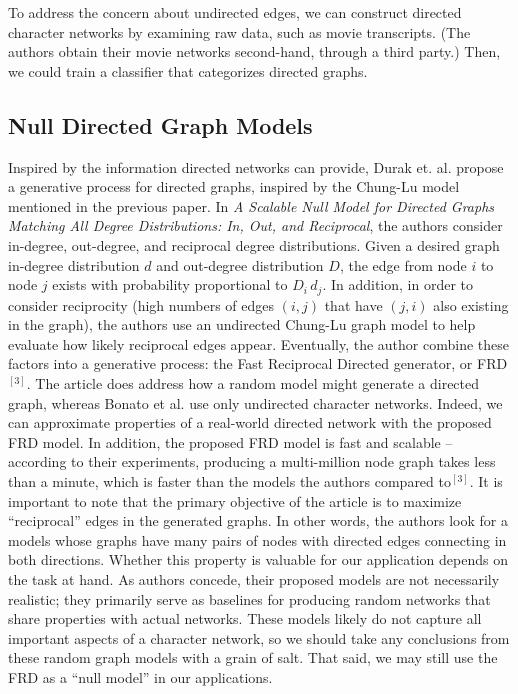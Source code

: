 \documentclass{article}
\begin{document}
\newline\newline
To address the concern about undirected edges, we can construct directed character networks by examining raw data, such as movie transcripts. (The authors obtain their movie networks second-hand, through a third party.) Then, we could train a classifier that categorizes directed graphs. 



\subsection{Null Directed Graph Models}
Inspired by the information directed networks can provide, Durak et. al. propose a generative process for directed graphs, inspired by the Chung-Lu model mentioned in the previous paper. In \textit{A Scalable Null Model for Directed Graphs Matching All Degree Distributions: In, Out, and Reciprocal}, the authors consider in-degree, out-degree, and reciprocal degree distributions. Given a desired graph in-degree distribution $d$ and out-degree distribution $D$, the edge from node $i$ to node $j$ exists with probability proportional to $D_i\,d_j$. In addition, in order to consider reciprocity (high numbers of edges $(i, j)$ that have $(j, i)$ also existing in the graph), the authors use an undirected Chung-Lu graph model to help evaluate how likely reciprocal edges appear. Eventually, the author combine these factors into a generative process: the Fast Reciprocal Directed generator, or FRD$^{[3]}$.
\newline\newline
The article does address how a random model might generate a directed graph, whereas Bonato et al. use only undirected character networks. Indeed, we can approximate properties of a real-world directed network with the proposed FRD model. In addition, the proposed FRD model is fast and scalable -- according to their experiments, producing a multi-million node graph takes less than a minute, which is faster than the models the authors compared to$^{[3]}$.
\newline\newline
It is important to note that the primary objective of the article is to maximize ``reciprocal'' edges in the generated graphs. In other words, the authors look for a models whose graphs have many pairs of nodes with directed edges connecting in both directions. Whether this property is valuable for our application depends on the task at hand.
\newline\newline
As authors concede, their proposed models are not necessarily realistic; they primarily serve as baselines for producing random networks that share properties with actual networks. These models likely do not capture all important aspects of a character network, so we should take any conclusions from these random graph models with a grain of salt. That said, we may still use the FRD as a ``null model'' in our applications.
\end{document}
